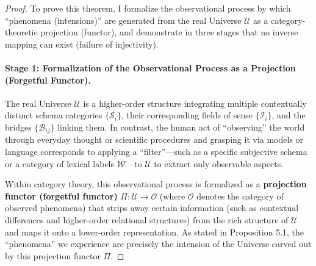 \documentclass[11pt,a4paper]{article}
\theoremstyle{definition}
\theoremstyle{plain}
\begin{document}
\begin{proof}
To prove this theorem, I formalize the observational process by which ``phenomena (intensions)'' are generated from the real Universe $\mathcal{U}$ as a category-theoretic projection (functor), and demonstrate in three stages that no inverse mapping can exist (failure of injectivity).

\paragraph{Stage 1: Formalization of the Observational Process as a Projection (Forgetful Functor).}
The real Universe $\mathcal{U}$ is a higher-order structure integrating multiple contextually distinct schema categories $\{\mathcal{S}_i\}$, their corresponding fields of sense $\{\mathcal{I}_i\}$, and the bridges $\{\mathcal{B}_{ij}\}$ linking them. In contrast, the human act of ``observing'' the world through everyday thought or scientific procedures and grasping it via models or language corresponds to applying a ``filter''---such as a specific subjective schema or a category of lexical labels $\mathcal{W}$---to $\mathcal{U}$ to extract only observable aspects.

Within category theory, this observational process is formalized as a \textbf{projection functor (forgetful functor)} $\Pi: \mathcal{U} \to \mathcal{O}$ (where $\mathcal{O}$ denotes the category of observed phenomena) that strips away certain information (such as contextual differences and higher-order relational structures) from the rich structure of $\mathcal{U}$ and maps it onto a lower-order representation. As stated in Proposition 5.1, the ``phenomena'' we experience are precisely the intension of the Universe carved out by this projection functor $\Pi$.


\end{proof}
\end{document}
